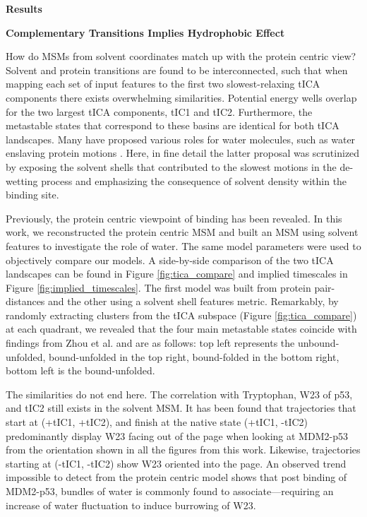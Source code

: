 
\textbf{Results}

\textbf{Complementary Transitions Implies Hydrophobic Effect}

How do MSMs from solvent coordinates match up with the protein centric
view? Solvent and protein transitions are found to be interconnected,
such that when mapping each set of input features to the first two
slowest-relaxing tICA components there exists overwhelming similarities.
Potential energy wells overlap for the two largest tICA
components, tIC1 and tIC2. Furthermore, the metastable states that correspond
to these basins are identical for both tICA landscapes. Many have
proposed various roles for water molecules, such as water enslaving
protein motions \cite{bellissent2016water}. Here, in fine detail the latter proposal was
scrutinized by exposing the solvent shells that contributed to the
slowest motions in the de-wetting process and emphasizing the
consequence of solvent density within the binding site.

Previously, the protein centric viewpoint of binding has been
revealed. In this work, we reconstructed the protein centric MSM and built an MSM using solvent features to investigate the role of water. The same model parameters were used to objectively compare our models. A side-by-side comparison of the two tICA landscapes can be found in Figure \ref{fig:tica_compare} and implied timescales in Figure \ref{fig:implied_timescales}. The first model was built from protein pair-distances and the other using a solvent shell features metric. Remarkably, by randomly extracting clusters from the tICA subspace (Figure \ref{fig:tica_compare}) at each quadrant, we revealed that the four main metastable states coincide with findings from Zhou et al. and are as follows: top left represents the unbound-unfolded, bound-unfolded in the top right, bound-folded in the bottom right, bottom left is the bound-unfolded.

The similarities do not end here. The correlation with Tryptophan, W23 of p53, and tIC2
still exists in the solvent MSM. It has been found that trajectories that start at (+tIC1, +tIC2), and finish at the native state (+tIC1, -tIC2) predominantly display W23 facing out of the page when looking at MDM2-p53 from the orientation shown in all the figures from this work. Likewise, trajectories starting at (-tIC1, -tIC2) show W23 oriented into the page.  An observed trend impossible to detect from the protein centric model shows that post binding of MDM2-p53, bundles of water is commonly found to associate—requiring an increase of water fluctuation to induce burrowing of W23.


